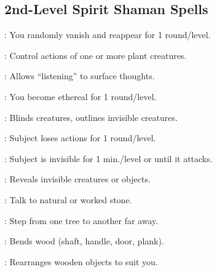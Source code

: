 \begin{multicols}{2}
\subsection{2nd-Level Spirit Shaman Spells}
\begin{description*}
\item[\linkspell{Blink}:] You randomly vanish and reappear for 1 round/level.
\item[\linkspell{Control Plants}:] Control actions of one or more plant creatures.
\item[\linkspell{Detect Thoughts}:] Allows “listening” to surface thoughts.
\item[\linkspell{Ethereal Jaunt}:] You become ethereal for 1 round/level.
\item[\linkspell{Glitterdust}:] Blinds creatures, outlines invisible creatures. 
\item[\linkspell{Tasha’s Hideous Laughter}:] Subject loses actions for 1 round/level.
\item[\linkspell{Invisibility}:] Subject is invisible for 1 min./level or until it attacks.
\item[\linkspell{See Invisibility}:] Reveals invisible creatures or objects.
\item[\linkspell{Stone Tell}:] Talk to natural or worked stone.
\item[\linkspell{Treestride}:] Step from one tree to another far away.
\item[\linkspell{Warp Wood}:] Bends wood (shaft, handle, door, plank).
\item[\linkspell{Wood Shape}:] Rearranges wooden objects to suit you. 
\end{description*}


\end{multicols}
